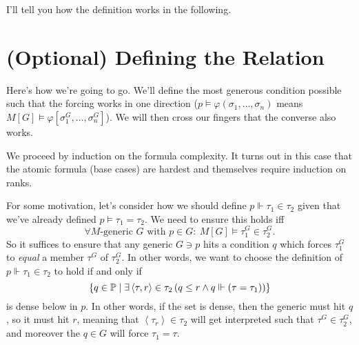 I'll tell you how the definition works in the following.

\section{(Optional) Defining the Relation}
Here's how we're going to go.
We'll define the most generous condition possible such that
the forcing works in one direction ($p \vDash \varphi(\sigma_1, \dots, \sigma_n)$ means
$M[G] \vDash \varphi[\sigma_1^G, \dots, \sigma_n^G]$).
We will then cross our fingers that the converse also works.

We proceed by induction on the formula complexity.
It turns out in this case that the atomic formula (base cases)
are hardest and themselves require induction on ranks.

For some motivation, let's consider how we should define $p \Vdash \tau_1 \in \tau_2$ given that we've already defined $p \vDash \tau_1 = \tau_2$.
We need to ensure this holds iff
\[ \forall \text{$M$-generic $G$ with $p \in G$}:
	\ M[G] \vDash \tau_1^G \in \tau_2^G. \]
So it suffices to ensure that any generic $G \ni p$ hits a condition $q$ which forces $\tau_1^G$ to \emph{equal} a member $\tau^G$ of $\tau_2^G$.
In other words, we want to choose the definition of $p \Vdash \tau_1 \in \tau_2$ to hold if and only if
\[
	\left\{ q \in \mathbb P
	\mid \exists \left<\tau, r\right> \in \tau_2 
	\left( q \le r \land q \Vdash(\tau=\tau_1) \right)
	\right\}
\]
is dense below in $p$.
In other words, if the set is dense, then the generic must hit $q$, so it must hit $r$, meaning that $\left<\tau_r\right> \in \tau_2$ will get interpreted such that $\tau^G \in \tau_2^G$, and moreover the $q \in G$ will force $\tau_1 = \tau$.

